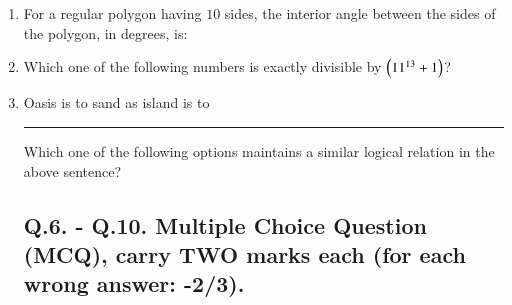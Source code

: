 \documentclass[journal,12pt,onecolumn]{IEEEtran}
\theoremstyle{remark}
\begin{document}
\begin{enumerate}
    \item For a regular polygon having $10$ sides, the interior angle between the sides of the polygon, in degrees, is: \hfill{}
        \begin{enumerate}
        \end{enumerate}
    
    \item Which one of the following numbers is exactly divisible by $\left(11^{13}+1\right)$? \hfill{}
        \begin{enumerate}
        \end{enumerate}
    
    \item Oasis is to sand as island is to \rule{3cm}{0.15mm} Which one of the following options maintains a similar logical relation in the above sentence? \hfill{}
        \begin{enumerate}
        \end{enumerate}
    
    \subsection*{Q.6. - Q.10. Multiple Choice Question (MCQ), carry TWO marks each (for each wrong answer: -2/3).}
    

\end{enumerate}
\end{document}
